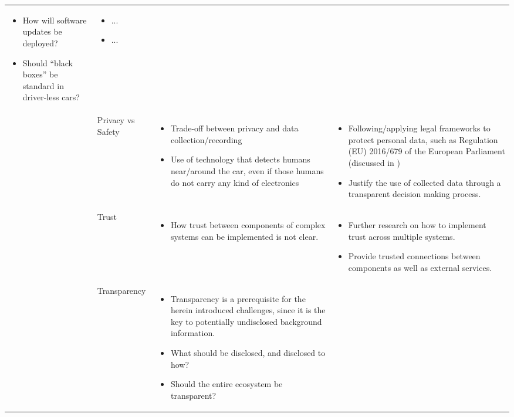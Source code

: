 \begin{table}
\begin{small}
\begin{supertabular}{>{}p{.02\textwidth}|>{\raggedright}p{.105\textwidth}>{\raggedright}p{.4\textwidth}>{\raggedright}p{.4\textwidth}}
\begin{itemize}
					\item How will software updates be deployed?
					\item Should \enquote{black boxes} be standard in driver-less cars?
					\end{itemize}
			& 
					\begin{itemize}
					\item ...
					\item ...
					\end{itemize}										 
 			 \tabularnewline {}
			& Privacy vs Safety & 
				\begin{itemize}
					\item Trade-off between privacy and data collection/recording
					\item Use of technology that detects humans near/around the car, even if those humans do not carry any kind of electronics  
				\end{itemize}
			& 
				\begin{itemize}
					\item Following/applying legal frameworks to protect personal data, such as Regulation (EU) 2016/679 of the European Parliament \cite{EuropeanUnion2016} (discussed in \cite{doi:10.1093/idpl/ipx005})
					\item Justify the use of collected data through a transparent decision making process.
				\end{itemize}	
 			 \tabularnewline {}
			& Trust & 
				\begin{itemize}
					\item How trust between components of complex systems can be implemented is not clear.
				\end{itemize}
			& 
				\begin{itemize}
					\item Further research on how to implement trust across multiple systems. 
					\item Provide trusted connections between components as well as external services.
				\end{itemize}
 			 \tabularnewline {}
			& Transparency & 
                \begin{itemize}
					\item Transparency is a prerequisite for the herein introduced challenges, since it is the key to potentially undisclosed background information.
					\item What should be disclosed, and disclosed to how?
					\item Should the entire ecosystem be transparent?

\end{itemize}
\end{supertabular}
\end{small}
\end{table}
